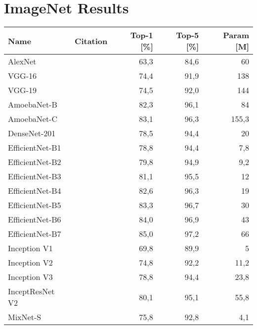 \chapter{ImageNet Results}
\begin{longtabu} to \textwidth {ll|r|r|r}
\toprule
Name & Citation & Top-1 [\%] & Top-5 [\%] & Param [M] \\
\bottomrule
\toprule
AlexNet         & \citet{krizhevsky2012imagenet} & 63,3    & 84,6   &  60  \\
\bottomrule
VGG-16          & \citet{simonyan2014very}       & 74,4    & 91,9    & 138     \\
VGG-19          & \citet{simonyan2014very}       & 74,5    & 92,0    & 144    \\
\bottomrule
AmoebaNet-B   & \citet{real2019regularized}    & 82,3    & 96,1    & 84      \\
AmoebaNet-C   & \citet{real2019regularized}    & 83,1    & 96,3    & 155,3      \\
\bottomrule
DenseNet-201  & \citet{huang2017densely}       & 78,5    & 94,4    & 20      \\
\bottomrule
EfficientNet-B1  & \citet{tan2019efficientnet}  & 78,8     & 94,4     & 7,8     \\
EfficientNet-B2  & \citet{tan2019efficientnet}  & 79,8     & 94,9     & 9,2      \\
EfficientNet-B3  & \citet{tan2019efficientnet}  & 81,1     & 95,5     & 12      \\
EfficientNet-B4  & \citet{tan2019efficientnet}  & 82,6     & 96,3     & 19      \\
EfficientNet-B5  & \citet{tan2019efficientnet}  & 83,3     & 96,7     & 30      \\
EfficientNet-B6  & \citet{tan2019efficientnet}  & 84,0     & 96,9     & 43      \\
EfficientNet-B7  & \citet{tan2019efficientnet}  & 85,0     & 97,2     & 66      \\
\bottomrule
Inception V1        & \citet{szegedy2015going}       & 69,8     & 89,9     & 5      \\
Inception V2        & \citet{ioffe2015batch}         & 74,8     & 92,2     & 11,2      \\
Inception V3        & \citet{szegedy2016rethinking}  & 78,8     & 94,4     & 23,8       \\
InceptResNet V2     & \citet{szegedy2017inception}   & 80,1     & 95,1     & 55,8     \\
\bottomrule
  MixNet-S          & \citet{tan2019mixconv}    & 75,8      & 92,8     & 4,1     \\

\end{longtabu}
